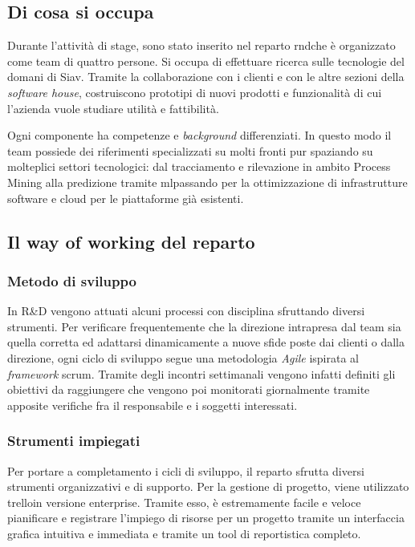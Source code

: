 \subsection{Di cosa si occupa}
Durante l'attività di stage, sono stato inserito nel reparto \acrshort{rnd}\glsfirstoccur che è organizzato come team di quattro persone. Si occupa di effettuare ricerca sulle tecnologie del domani di Siav. Tramite la collaborazione con i clienti e con le altre sezioni della \textit{software house}, costruiscono prototipi di nuovi prodotti e funzionalità di cui l'azienda vuole studiare utilità e fattibilità.

Ogni componente ha competenze e \textit{background} differenziati. In questo modo il team possiede dei riferimenti specializzati su molti fronti pur spaziando su molteplici settori tecnologici: dal tracciamento e rilevazione in ambito Process Mining alla predizione tramite \acrlong{ml}\glsfirstoccur passando per la ottimizzazione di infrastrutture software e cloud per le piattaforme già esistenti.

\subsection{Il way of working del reparto}
\subsubsection{Metodo di sviluppo}
In R\&D vengono attuati alcuni processi con disciplina sfruttando diversi strumenti.
Per verificare frequentemente che la direzione intrapresa dal team sia quella corretta ed adattarsi dinamicamente a nuove sfide poste dai clienti o dalla direzione, ogni ciclo di sviluppo segue una metodologia \textit{Agile} ispirata al \textit{framework} \gls{scrum}\glsfirstoccur. Tramite degli incontri settimanali vengono infatti definiti gli obiettivi da raggiungere che vengono poi monitorati giornalmente tramite apposite verifiche fra il responsabile e i soggetti interessati.
\subsubsection{Strumenti impiegati}
Per portare a completamento i cicli di sviluppo, il reparto sfrutta diversi strumenti organizzativi e di supporto.
Per la gestione di progetto, viene utilizzato \gls{trello}\glsfirstoccur in versione enterprise. Tramite esso, è estremamente facile e veloce pianificare e registrare l'impiego di risorse per un progetto tramite un interfaccia grafica intuitiva e immediata e tramite un tool di reportistica completo.

